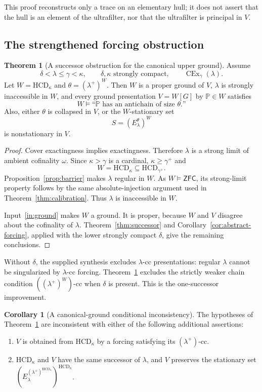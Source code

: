 \documentclass[11pt,letterpaper]{article}
\theoremstyle{definition}
\newtheorem{theorem}[definition]{Theorem}
\newtheorem{corollary}[definition]{Corollary}
\numberwithin{equation}{section}
\newcommand{\ZFC}{\mathsf{ZFC}}
\newcommand{\HCD}{\mathrm{HCD}}
\newcommand{\CEx}{\operatorname{CEx}}
\newcommand{\PP}{\mathbb P}
\newcommand{\cc}{\text{-cc}}
\begin{document}
This proof reconstructs only a trace on an elementary hull; it does not assert that the hull is an element of the ultrafilter, nor that the ultrafilter is principal in $V$.

\subsection{The strengthened forcing obstruction}

\begin{samepage}
\begin{theorem}[A successor obstruction for the canonical upper ground]\label{thm:groundplus}
Assume
\[
\delta<\lambda\le\gamma<\kappa,
\qquad \delta,\kappa\text{ strongly compact},
\qquad\CEx_\gamma(\lambda).
\]
Let $W=\HCD_\kappa$ and $\theta=(\lambda^+)^W$. Then $W$ is a proper ground of $V$, $\lambda$ is strongly inaccessible in $W$, and every ground presentation $V=W[G]$ by $\PP\in W$ satisfies
\[
W\models\text{``$\PP$ has an antichain of size $\theta$.''}
\]
Also, either $\theta$ is collapsed in $V$, or the $W$-stationary set
\[
S=(E^\theta_\lambda)^W
\]
is nonstationary in $V$.
\end{theorem}
\end{samepage}

\begin{proof}
Cover exactingness implies exactingness. Therefore $\lambda$ is a strong limit of ambient cofinality $\omega$. Since $\kappa>\gamma$ is a cardinal, $\kappa\ge\gamma^+$ and
\[
W=\HCD_\kappa\subseteq\HCD_{\gamma^+}.
\]
Proposition~\ref{prop:barrier} makes $\lambda$ regular in $W$. As $W\models\ZFC$, its strong-limit property follows by the same absolute-injection argument used in Theorem~\ref{thm:calibration}. Thus $\lambda$ is inaccessible in $W$.

Input~\ref{in:ground} makes $W$ a ground. It is proper, because $W$ and $V$ disagree about the cofinality of $\lambda$. Theorem~\ref{thm:successor} and Corollary~\ref{cor:abstract-forcing}, applied with the lower strongly compact $\delta$, give the remaining conclusions.
\end{proof}

Without $\delta$, the supplied synthesis excludes $\lambda\cc$ presentations: regular $\lambda$ cannot be singularized by $\lambda\cc$ forcing. Theorem~\ref{thm:groundplus} excludes the strictly weaker chain condition $((\lambda^+)^W)\cc$ when $\delta$ is present. This is the one-successor improvement.

\begin{corollary}[A canonical-ground conditional inconsistency]
The hypotheses of Theorem~\ref{thm:groundplus} are inconsistent with either of the following additional assertions:
\begin{enumerate}
\item $V$ is obtained from $\HCD_\kappa$ by a forcing satisfying its $(\lambda^+)\cc$.
\item $\HCD_\kappa$ and $V$ have the same successor of $\lambda$, and $V$ preserves the stationary set $(E^{(\lambda^+)^{\HCD_\kappa}}_\lambda)^{\HCD_\kappa}$.
\end{enumerate}
\end{corollary}
\end{document}
